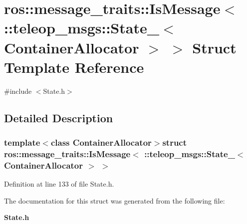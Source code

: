 \section{ros::message\_\-traits::IsMessage$<$ ::teleop\_\-msgs::State\_\-$<$ ContainerAllocator $>$ $>$ Struct Template Reference}
\label{structros_1_1message__traits_1_1IsMessage_3_01_1_1teleop__msgs_1_1State___3_01ContainerAllocator_01_4_01_4}


{\ttfamily \#include $<$State.h$>$}



\subsection{Detailed Description}
\subsubsection*{template$<$class ContainerAllocator$>$struct ros::message\_\-traits::IsMessage$<$ ::teleop\_\-msgs::State\_\-$<$ ContainerAllocator $>$ $>$}



Definition at line 133 of file State.h.



The documentation for this struct was generated from the following file:\begin{DoxyCompactItemize}
\item 
{\bf State.h}\end{DoxyCompactItemize}
